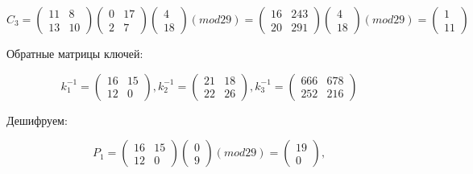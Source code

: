 \documentclass[a4paper]{article}
\begin{document}
\[
    C_3=
    \begin{pmatrix}
        11 & 8 \\
        13 & 10
    \end{pmatrix}
    \begin{pmatrix}
        0 & 17 \\
        2 & 7
    \end{pmatrix}
    \begin{pmatrix}
        4 \\
        18
    \end{pmatrix}
    (mod 29) =
    \begin{pmatrix}
        16 & 243 \\
        20 & 291
    \end{pmatrix}
    \begin{pmatrix}
        4 \\
        18
    \end{pmatrix}
    (mod 29) =
    \begin{pmatrix}
        1 \\
        11
    \end{pmatrix}
\]

Обратные матрицы ключей: 

\[
    k^{-1}_1=
    \begin{pmatrix}
        16 & 15 \\
        12 & 0
    \end{pmatrix},
    k^{-1}_2=
    \begin{pmatrix}
        21 & 18 \\
        22 & 26
    \end{pmatrix},
    k^{-1}_3=
    \begin{pmatrix}
        666 & 678 \\
        252 & 216
    \end{pmatrix}
\]

Дешифруем:

\[
    P_1=
    \begin{pmatrix}
        16 & 15 \\
        12 & 0
    \end{pmatrix}
    \begin{pmatrix}
        0 \\
        9
    \end{pmatrix}
    (mod 29) =
    \begin{pmatrix}
        19 \\
        0
    \end{pmatrix},
\]
\end{document}
